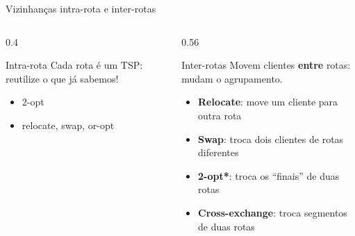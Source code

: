 \documentclass[aspectratio=169,xcolor=table]{beamer}
\begin{document}
\begin{frame}{Vizinhanças intra-rota e inter-rotas}
  \begin{columns}[T]
    \begin{column}{0.4\textwidth}
      \begin{block}{Intra-rota}
        Cada rota é um TSP: reutilize o que já sabemos!
        \begin{itemize}
          \item 2-opt \cite{croes1958method}
          \item relocate, swap, or-opt \cite{or1976traveling}
        \end{itemize}
      \end{block}
    \end{column}
    \begin{column}{0.56\textwidth}
      \begin{block}{Inter-rotas}
        Movem clientes \textbf{entre} rotas: mudam o agrupamento.
        \begin{itemize}
          \item \textbf{Relocate}: move um cliente para outra rota \cite{osman1993metastrategy}
          \item \textbf{Swap}: troca dois clientes de rotas diferentes \cite{osman1993metastrategy}
          \item \textbf{2-opt*}: troca os ``finais'' de duas rotas \cite{potvin1995exchange}
          \item \textbf{Cross-exchange}: troca segmentos de duas rotas \cite{taillard1997tabu}
        \end{itemize}
      \end{block}
    \end{column}
  \end{columns}
\end{frame}
\end{document}
